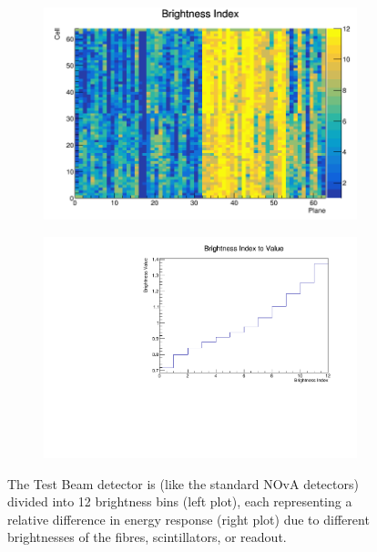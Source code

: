 \documentclass[12pt,a4paper]{article}
\begin{document}
\begin{figure}[hbtp]
\centering
\begin{subfigure}[b]{0.495\textwidth}
\centering
\includegraphics[width=\textwidth]{Plots/BrightnessIndex.png}
\end{subfigure}
\begin{subfigure}[b]{0.495\textwidth}
\centering
\includegraphics[width=\textwidth]{Plots/BrightnessIndexToValue.pdf}
\end{subfigure}
\caption{The Test Beam detector is (like the standard NOvA detectors) divided into 12 brightness bins (left plot), each representing a relative difference in energy response (right plot) due to different brightnesses of the fibres, scintillators, or readout.}
\label{figFiberBrightnessBins}
\end{figure}
\end{document}
